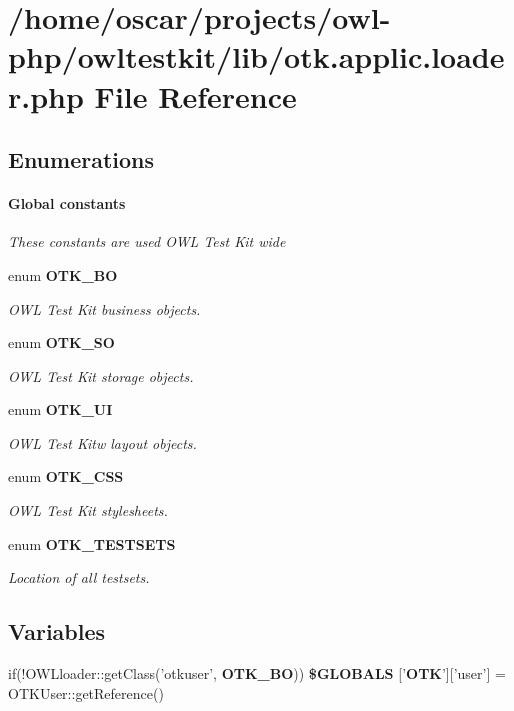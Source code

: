 \section{/home/oscar/projects/owl-\/php/owltestkit/lib/otk.applic.loader.php File Reference}
\label{otk_8applic_8loader_8php}
\subsection*{Enumerations}
\begin{Indent}\paragraph*{Global constants}
{\em These constants are used OWL Test Kit wide }\begin{DoxyCompactItemize}
\item 
enum {\bf OTK\_\-BO} 
\begin{DoxyCompactList}\small\item\em OWL Test Kit business objects. \end{DoxyCompactList}\item 
enum {\bf OTK\_\-SO} 
\begin{DoxyCompactList}\small\item\em OWL Test Kit storage objects. \end{DoxyCompactList}\item 
enum {\bf OTK\_\-UI} 
\begin{DoxyCompactList}\small\item\em OWL Test Kitw layout objects. \end{DoxyCompactList}\item 
enum {\bf OTK\_\-CSS} 
\begin{DoxyCompactList}\small\item\em OWL Test Kit stylesheets. \end{DoxyCompactList}\item 
enum {\bf OTK\_\-TESTSETS} 
\begin{DoxyCompactList}\small\item\em Location of all testsets. \end{DoxyCompactList}\end{DoxyCompactItemize}
\end{Indent}
\subsection*{Variables}
\begin{DoxyCompactItemize}
\item 
if(!OWLloader::getClass('otkuser', {\bf OTK\_\-BO})) {\bf \$GLOBALS} ['{\bf OTK}']['user'] = OTKUser::getReference()
\end{DoxyCompactItemize}


